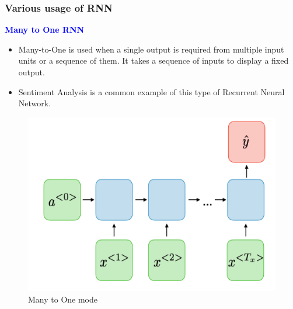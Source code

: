 \documentclass[
	11pt,
]{beamer}
\begin{document}
\begin{frame}
	\frametitle{Various usage of RNN}
	\large{\textcolor{blue}{\textbf{Many to One RNN}}}
	\begin{itemize}
		\item Many-to-One is used when a single output is required from multiple input units or a sequence of them. It takes a sequence of inputs to display a fixed output.
		\item Sentiment Analysis is a common example of this type of Recurrent Neural Network.
	\end{itemize}
	\begin{figure}[h]
		\centering
		\includegraphics[scale=0.4]{Images/many_to_one.png}
		\caption{Many to One mode}
	\end{figure}
\end{frame}
\end{document}
